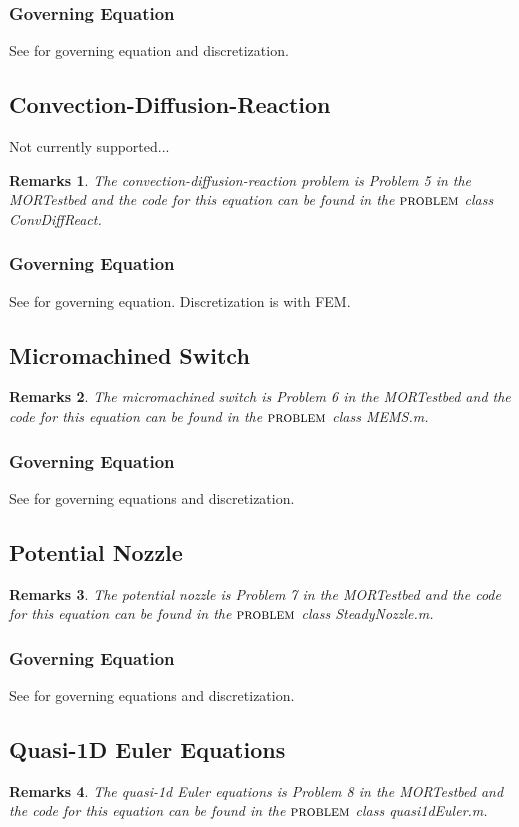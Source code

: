 \documentclass[notitlepage]{report}
\newtheorem*{Rem}{Remarks}
\newcommand{\problem}{\ensuremath{\textsc{problem }}}
\begin{document}
\subsubsection{Governing Equation}
See \cite{chaturantabut2009discrete} for governing equation and discretization.

\subsection{Convection-Diffusion-Reaction}
Not currently supported...
\begin{Rem}
The convection-diffusion-reaction problem is Problem 5 in the MORTestbed and the code for this equation can be found in the \problem class ConvDiffReact.
\end{Rem}
\subsubsection{Governing Equation}
See \cite{barone2009reduced} for governing equation.  Discretization is with FEM.

\subsection{Micromachined Switch}
\begin{Rem}
The micromachined switch is Problem 6 in the MORTestbed and the code for this equation can be found in the \problem class MEMS.m.
\end{Rem}
\subsubsection{Governing Equation}
See \cite{rewienski2003trajectory} for governing equations and discretization.

\subsection{Potential Nozzle}
\begin{Rem}
The potential nozzle is Problem 7 in the MORTestbed and the code for this equation can be found in the \problem class SteadyNozzle.m.
\end{Rem}
\subsubsection{Governing Equation}
See \cite{biegler2003large} for governing equations and discretization.

\subsection{Quasi-1D Euler Equations}
\begin{Rem}
The quasi-1d Euler equations is Problem 8 in the MORTestbed and the code for this equation can be found in the \problem class quasi1dEuler.m.
\end{Rem}
\end{document}
